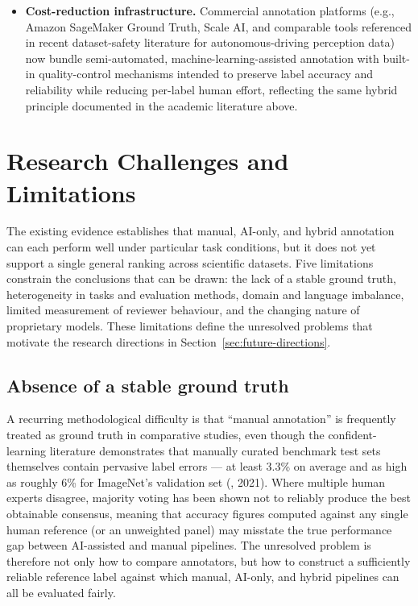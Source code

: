 \documentclass[acmsmall,nonacm]{acmart}
\begin{document}
\begin{itemize}
    \item \textbf{Cost-reduction infrastructure.} Commercial annotation platforms (e.g., Amazon SageMaker Ground Truth, Scale AI, and comparable tools referenced in recent dataset-safety literature for autonomous-driving perception data) now bundle semi-automated, machine-learning-assisted annotation with built-in quality-control mechanisms intended to preserve label accuracy and reliability while reducing per-label human effort, reflecting the same hybrid principle documented in the academic literature above.
\end{itemize}

\section{Research Challenges and Limitations}
\label{sec:challenges}

The existing evidence establishes that manual, AI-only, and hybrid annotation can each perform well under particular task conditions, but it does not yet support a single general ranking across scientific datasets. Five limitations constrain the conclusions that can be drawn: the lack of a stable ground truth, heterogeneity in tasks and evaluation methods, domain and language imbalance, limited measurement of reviewer behaviour, and the changing nature of proprietary models. These limitations define the unresolved problems that motivate the research directions in Section~\ref{sec:future-directions}.

\subsection{Absence of a stable ground truth}
\label{subsec:ground-truth}

A recurring methodological difficulty is that ``manual annotation'' is frequently treated as ground truth in comparative studies, even though the confident-learning literature demonstrates that manually curated benchmark test sets themselves contain pervasive label errors --- at least 3.3\% on average and as high as roughly 6\% for ImageNet's validation set (\citeauthor{northcutt2021pervasive}, 2021). Where multiple human experts disagree, majority voting has been shown not to reliably produce the best obtainable consensus, meaning that accuracy figures computed against any single human reference (or an unweighted panel) may misstate the true performance gap between AI-assisted and manual pipelines. The unresolved problem is therefore not only how to compare annotators, but how to construct a sufficiently reliable reference label against which manual, AI-only, and hybrid pipelines can all be evaluated fairly.
\end{document}
